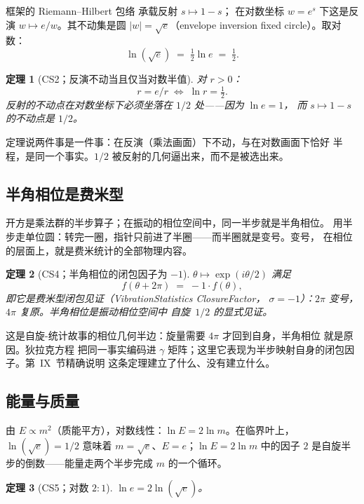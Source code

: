 \documentclass[aps,prd,preprint,superscriptaddress,amsmath,amssymb]{revtex4-2}
\newtheorem{theorem}{定理}[section]
\begin{document}
框架的 Riemann--Hilbert 包络 \cite{RiemannHIBS} 承载反射 $s\mapsto 1-s$；
在对数坐标 $w=e^s$ 下这是反演 $w\mapsto e/w$。其不动集是圆
$|w|=\sqrt e$（envelope inversion fixed circle）。取对数：
\begin{equation}
\label{eq:half}
\ln(\sqrt e)\;=\;\tfrac12\ln e\;=\;\tfrac12 .
\end{equation}

\begin{theorem}[CS2；反演不动当且仅当对数半值]
\label{thm:cs2}
对 $r>0$：
\[
r=e/r \;\Longleftrightarrow\; \ln r=\tfrac12 .
\]
反射的不动点在对数坐标下必须坐落在 $1/2$ 处——因为 $\ln e=1$，
而 $s\mapsto 1-s$ 的不动点是 $1/2$。
\end{theorem}

定理说两件事是一件事：在反演（乘法画面）下不动，与在对数画面下恰好
半程，是同一个事实。$1/2$ 被反射的几何逼出来，而不是被选出来。

\subsection{半角相位是费米型}

开方是乘法群的半步算子；在振动的相位空间中，同一半步就是半角相位。
用半步走单位圆：转完一圈，指针只前进了半圈——而半圈就是变号。变号，
在相位的层面上，就是费米统计的全部物理内容。

\begin{theorem}[CS4；半角相位的闭包因子为 $-1$]
\label{thm:cs4}
$\theta\mapsto\exp(i\theta/2)$ 满足
\[
f(\theta+2\pi)\;=\;-1\cdot f(\theta),
\]
即它是费米型闭包见证（VibrationStatistics ClosureFactor，
$\sigma=-1$）：$2\pi$ 变号，$4\pi$ 复原。半角相位是振动相位空间中
自旋~$1/2$ 的显式见证。
\end{theorem}

这是自旋-统计故事的相位几何半边：旋量需要 $4\pi$ 才回到自身，半角相位
就是原因。狄拉克方程 \cite{dirac1928quantum} 把同一事实编码进
$\gamma$ 矩阵；这里它表现为半步映射自身的闭包因子。第~IX~节精确说明
这条定理建立了什么、没有建立什么。

\subsection{能量与质量}

由 $E\propto m^2$（质能平方），对数线性：$\ln E=2\ln m$。在临界叶上，
$\ln(\sqrt e)=1/2$ 意味着 $m=\sqrt e$、$E=e$；$\ln E=2\ln m$ 中的因子 $2$
是自旋半步的倒数——能量走两个半步完成 $m$ 的一个循环。

\begin{theorem}[CS5；对数 $2{:}1$]
\label{thm:cs5}
$\ln e=2\ln(\sqrt e)$。
\end{theorem}
\end{document}
